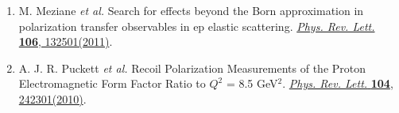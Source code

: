 \begin{singlespace}
\begin{changemargin}{-10pt}{0in}
\begin{enumerate}
	\item M. Meziane \textit{et al.} 
	Search for effects beyond the Born approximation in polarization transfer observables in ep elastic scattering.
	\href{http://prl.aps.org/abstract/PRL/v106/i13/e132501}{\textit{Phys. Rev. Lett.} \textbf{106}, 132501(2011)}. %

	\item A. J. R. Puckett \textit{et al.}
	Recoil Polarization Measurements of the Proton Electromagnetic Form Factor Ratio to $Q^2$ = 8.5 GeV$^2$.
	\href{http://prl.aps.org/abstract/PRL/v104/i24/e242301}{\textit{Phys. Rev. Lett.} \textbf{104}, 242301(2010)}. %

\end{enumerate}
\end{changemargin}


\end{singlespace}
